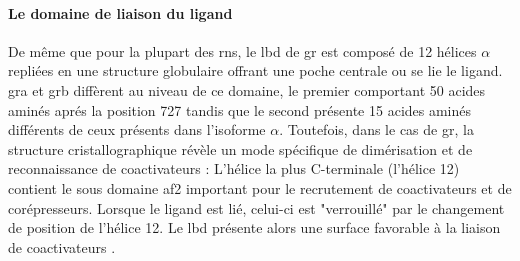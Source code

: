 \documentclass[../main.tex]{subfiles}
\begin{document}
\paragraph{Le domaine de liaison du ligand}
De même que pour la plupart des \glspl{rn}, le \gls{lbd} de \gls{gr} est composé de 12 hélices $\alpha$ repliées en une structure globulaire offrant une poche centrale ou se lie le ligand.
\gls{gra} et \gls{grb} diffèrent au niveau de ce domaine, le premier comportant 50 acides aminés aprés la position 727 tandis que le second présente 15 acides aminés différents de ceux présents dans l'isoforme $\alpha$.
Toutefois, dans le cas de \gls{gr}, la structure cristallographique révèle un mode spécifique de dimérisation et de reconnaissance de coactivateurs \citep{Bledsoe2002}:
L'hélice la plus C-terminale (l'hélice 12) contient le sous domaine \gls{af2} important pour le recrutement de coactivateurs et de corépresseurs.
Lorsque le ligand est lié, celui-ci est "verrouillé" par le changement de position de l'hélice 12.
Le \gls{lbd} présente alors une surface favorable à la liaison de coactivateurs \citep{Bledsoe2002}.

\end{document}
